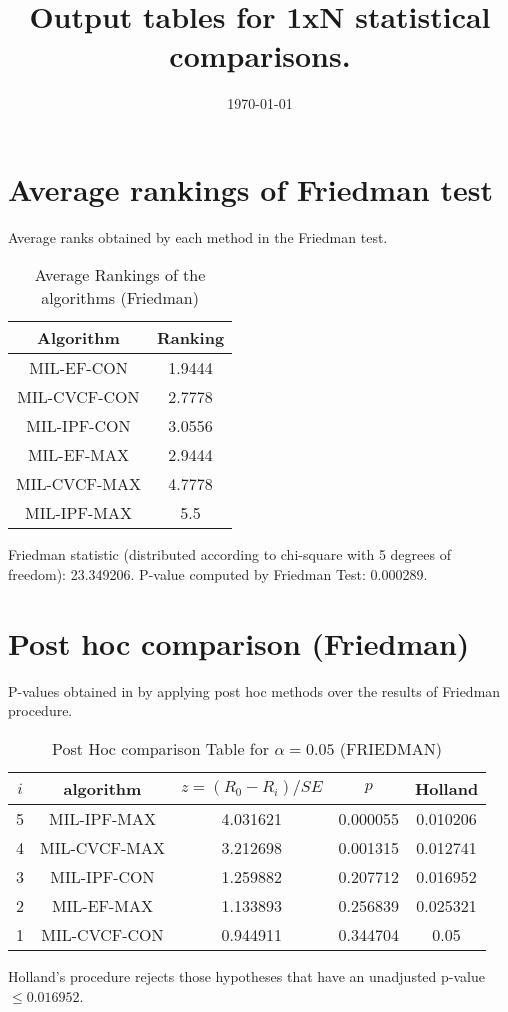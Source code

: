 \documentclass[a4paper,10pt]{article}
\title{Output tables for 1xN statistical comparisons.}
\author{}
\date{\today}
\begin{document}
\begin{landscape}
\pagestyle{empty}
\maketitle
\thispagestyle{empty}

\section{Average rankings of Friedman test}


Average ranks obtained by each method in the Friedman test.

\begin{table}[!htp]
\centering
\begin{tabular}{|c|c|}\hline
Algorithm&Ranking\\\hline
MIL-EF-CON&1.9444\\MIL-CVCF-CON&2.7778\\MIL-IPF-CON&3.0556\\MIL-EF-MAX&2.9444\\MIL-CVCF-MAX&4.7778\\MIL-IPF-MAX&5.5\\\hline\end{tabular}
\caption{Average Rankings of the algorithms (Friedman)}
\end{table}

Friedman statistic (distributed according to chi-square with 5 degrees of freedom): 23.349206. \newline P-value computed by Friedman Test: 0.000289.\newline


\newpage

\section{Post hoc comparison (Friedman)}


P-values obtained in by applying post hoc methods over the results of Friedman procedure.

\begin{table}[!htp]
\centering\footnotesize
\begin{tabular}{ccccc}
$i$&algorithm&$z=(R_0 - R_i)/SE$&$p$&Holland\\
\hline5&MIL-IPF-MAX&4.031621&0.000055&0.010206\\4&MIL-CVCF-MAX&3.212698&0.001315&0.012741\\3&MIL-IPF-CON&1.259882&0.207712&0.016952\\2&MIL-EF-MAX&1.133893&0.256839&0.025321\\1&MIL-CVCF-CON&0.944911&0.344704&0.05\\\hline
\end{tabular}
\caption{Post Hoc comparison Table for $\alpha=0.05$ (FRIEDMAN)}
\end{table}Holland's procedure rejects those hypotheses that have an unadjusted p-value $\le0.016952$.



\end{landscape}
\end{document}
